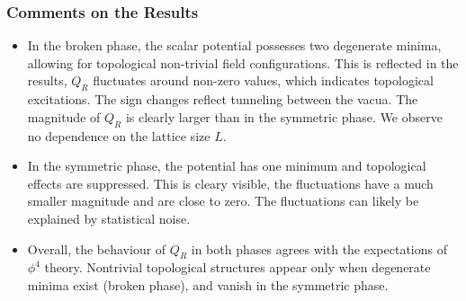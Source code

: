 \subsubsection*{Comments on the Results}
\begin{itemize}
    \item In the broken phase, the scalar potential possesses two degenerate minima, allowing for topological non-trivial field configurations. This is reflected in the results, $Q_R$ fluctuates around non-zero values, which indicates topological excitations. The sign changes reflect tunneling between the vacua. The magnitude of $Q_R$ is clearly larger than in the symmetric phase. We observe no dependence on the lattice size $L$. 
    \item In the symmetric phase, the potential has one minimum and topological effects are suppressed. This is cleary visible, the fluctuations have a much smaller magnitude and are close to zero. The fluctuations can likely be explained by statistical noise. 
    \item Overall, the behaviour of $Q_R$ in both phases agrees with the expectations of $\phi^4$ theory. Nontrivial topological structures appear only when degenerate minima exist (broken phase), and vanish in the symmetric phase.
\end{itemize}